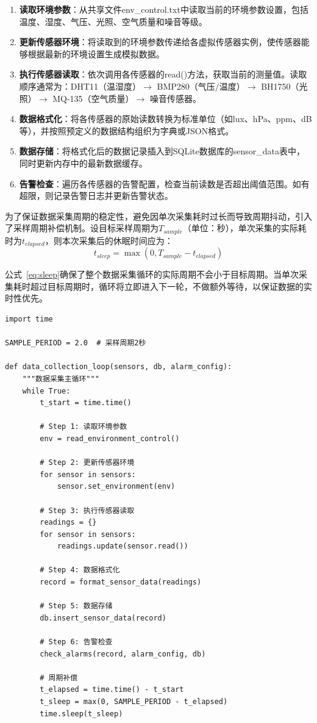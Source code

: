 \documentclass[12pt,a4paper]{ctexart}
\begin{document}
\begin{enumerate}[leftmargin=2em]
    \item \textbf{读取环境参数}：从共享文件env\_control.txt中读取当前的环境参数设置，包括温度、湿度、气压、光照、空气质量和噪音等级。
    \item \textbf{更新传感器环境}：将读取到的环境参数传递给各虚拟传感器实例，使传感器能够根据最新的环境设置生成模拟数据。
    \item \textbf{执行传感器读取}：依次调用各传感器的read()方法，获取当前的测量值。读取顺序通常为：DHT11（温湿度）$\rightarrow$ BMP280（气压/温度）$\rightarrow$ BH1750（光照）$\rightarrow$ MQ-135（空气质量）$\rightarrow$ 噪音传感器。
    \item \textbf{数据格式化}：将各传感器的原始读数转换为标准单位（如lux、hPa、ppm、dB等），并按照预定义的数据结构组织为字典或JSON格式。
    \item \textbf{数据存储}：将格式化后的数据记录插入到SQLite数据库的sensor\_data表中，同时更新内存中的最新数据缓存。
    \item \textbf{告警检查}：遍历各传感器的告警配置，检查当前读数是否超出阈值范围。如有超限，则记录告警日志并更新告警状态。
\end{enumerate}

为了保证数据采集周期的稳定性，避免因单次采集耗时过长而导致周期抖动，引入了采样周期补偿机制。设目标采样周期为$T_{sample}$（单位：秒），单次采集的实际耗时为$t_{elapsed}$，则本次采集后的休眠时间应为：
\begin{equation}
    t_{sleep} = \max(0, T_{sample} - t_{elapsed})
    \label{eq:sleep}
\end{equation}

公式~\ref{eq:sleep}确保了整个数据采集循环的实际周期不会小于目标周期。当单次采集耗时超过目标周期时，循环将立即进入下一轮，不做额外等待，以保证数据的实时性优先。

\begin{lstlisting}[caption={数据采集循环核心实现},label={lst:loop}]
import time

SAMPLE_PERIOD = 2.0  # 采样周期2秒

def data_collection_loop(sensors, db, alarm_config):
    """数据采集主循环"""
    while True:
        t_start = time.time()
        
        # Step 1: 读取环境参数
        env = read_environment_control()
        
        # Step 2: 更新传感器环境
        for sensor in sensors:
            sensor.set_environment(env)
        
        # Step 3: 执行传感器读取
        readings = {}
        for sensor in sensors:
            readings.update(sensor.read())
        
        # Step 4: 数据格式化
        record = format_sensor_data(readings)
        
        # Step 5: 数据存储
        db.insert_sensor_data(record)
        
        # Step 6: 告警检查
        check_alarms(record, alarm_config, db)
        
        # 周期补偿
        t_elapsed = time.time() - t_start
        t_sleep = max(0, SAMPLE_PERIOD - t_elapsed)
        time.sleep(t_sleep)
\end{lstlisting}
\end{document}
